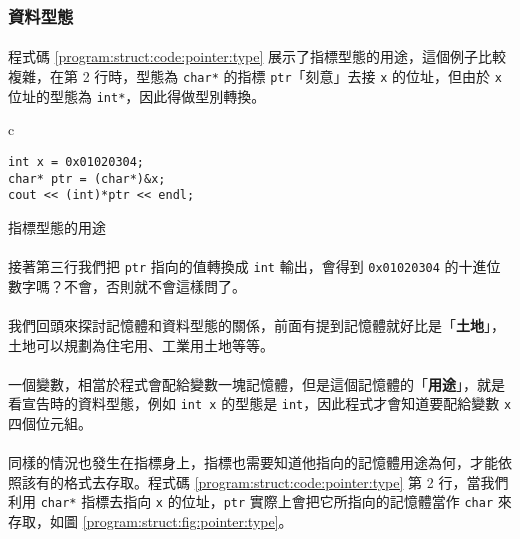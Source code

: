 \documentclass[12pt,a4paper,oneside]{report}
\begin{document}
\begin{CJK}{UTF8}{bkai}
\subsubsection{資料型態}

\paragraph{}程式碼 \ref{program:struct:code:pointer:type} 展示了指標型態的用途，這個例子比較複雜，在第 2 行時，型態為 \lstinline!char*! 的指標 \lstinline!ptr!「刻意」去接 \lstinline!x! 的位址，但由於 \lstinline!x! 位址的型態為 \lstinline!int*!，因此得做型別轉換。

\begin{code}[h!]
\centering
\begin{tabular}{c}
\begin{lstlisting}
int x = 0x01020304;
char* ptr = (char*)&x;
cout << (int)*ptr << endl;
\end{lstlisting}
\end{tabular}
\caption{指標型態的用途}
\label{program:struct:code:pointer:type}
\end{code}

\paragraph{}接著第三行我們把 \lstinline!ptr! 指向的值轉換成 \lstinline!int! 輸出，會得到 \lstinline!0x01020304! 的十進位數字嗎？不會，否則就不會這樣問了。
\paragraph{}我們回頭來探討記憶體和資料型態的關係，前面有提到記憶體就好比是「\textbf{土地}」，土地可以規劃為住宅用、工業用土地等等。
\paragraph{}一個變數，相當於程式會配給變數一塊記憶體，但是這個記憶體的「\textbf{用途}」，就是看宣告時的資料型態，例如 \lstinline!int x! 的型態是 \lstinline!int!，因此程式才會知道要配給變數 \lstinline!x! 四個位元組。
\paragraph{}同樣的情況也發生在指標身上，指標也需要知道他指向的記憶體用途為何，才能依照該有的格式去存取。程式碼 \ref{program:struct:code:pointer:type} 第 2 行，當我們利用 \lstinline!char*! 指標去指向 \lstinline!x! 的位址，\lstinline!ptr! 實際上會把它所指向的記憶體當作 \lstinline!char! 來存取，如圖 \ref{program:struct:fig:pointer:type}。


\end{CJK}
\end{document}
